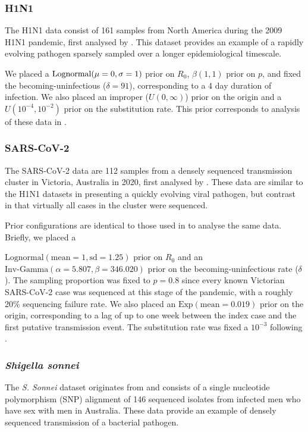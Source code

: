 \documentclass{article}
\begin{document}
\begin{spacing}{1.5}
\subsubsection*{H1N1}
The H1N1 data consist of 161 samples from North America during the 2009 H1N1 pandemic, first analysed by \citet{hedge_2013_real-time}. This  dataset provides an example of a rapidly evolving pathogen sparsely sampled over a longer epidemiological timescale. 

We placed a $\textnormal{Lognormal}(\mu=0,\sigma=1)$ prior on $R_0$, $\beta(1,1)$ prior on $p$, and fixed the becoming-uninfectious ($\delta = 91$), corresponding to a 4 day duration of infection. We also placed an improper ($U(0,\infty)$) prior on the origin and a $U(10^{-4},10^{-2})$ prior on the substitution rate. This prior corresponds to analysis of these data in \citet{featherstone_decoding_2023}.

\subsubsection*{SARS-CoV-2}
The SARS-CoV-2 data are 112 samples from a densely sequenced transmission cluster in Victoria, Australia in 2020, first analysed by \citet{lane2021genomics}. These data are similar to the H1N1 datasets in presenting a quickly evolving viral pathogen, but contrast in that virtually all cases in the cluster were sequenced. 

Prior configurations are identical to those used in \citet{featherstone_decoding_2023} to analyse the same data. Briefly, we placed a 

$\textrm{Lognormal}(\textrm{mean}=1, \textrm{sd}=1.25)$ prior on $R_0$ and an $\textrm{Inv-Gamma}(\alpha=5.807, \beta=346.020)$ prior on the becoming-uninfectious rate ($\delta$).  The sampling proportion was fixed to $p=0.8$ since every known Victorian SARS-CoV-2 case was sequenced at this stage of the pandemic, with a roughly 20\% sequencing failure rate. We also placed an $\textrm{Exp}(\textrm{mean}=0.019)$ prior on the origin, corresponding to a lag of up to one week  between the index case and the first putative transmission event. The substitution rate was fixed a $10^{-3}$ following \citep{duchene_temporal_2020}.

\subsubsection*{\textit{Shigella sonnei}}
The \textit{S. Sonnei} dataset originates from \citet{ingle_co-circulation_2019} and consists of a single nucleotide polymorphism (SNP) alignment of 146 sequenced isolates from infected men who have sex with men in Australia. These data provide an example of densely sequenced transmission of a bacterial pathogen. 


\end{spacing}
\end{document}

